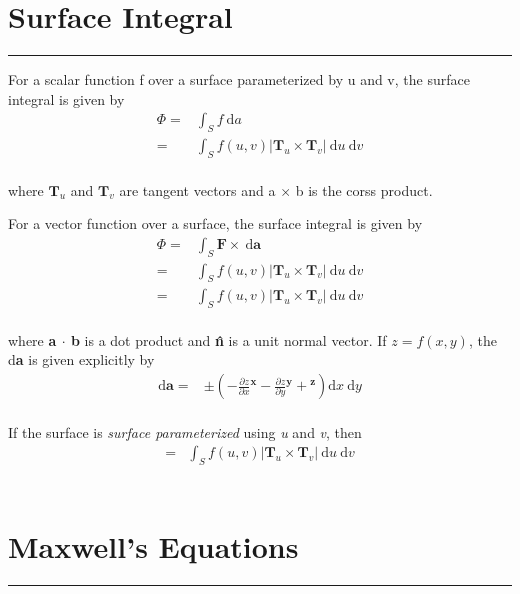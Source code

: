 \documentclass[letterpaper,10pt,fleqn]{article}
\numberwithin{equation}{section}
\newcommand{\D}{\mathrm{d}}
\begin{document}

\section*{Surface Integral}
\addtocounter{section}{1}
\hrule

For a scalar function f over a surface parameterized by u and v, the surface integral is given by
\\
\begin{eqnarray}
  \Phi =& \displaystyle\int_S f\ \D a \\
  =& \displaystyle\int_S f(u, v)|\mathbf{T}_u \times \mathbf{T}_v|\ \D u \ \D v
\end{eqnarray}
\\
where \(\mathbf{T}_u\) and \(\mathbf{T}_v\) are tangent vectors and a \(\times\) b is the corss product.

For a vector function over a surface, the surface integral is given by
\\
\begin{eqnarray}
  \Phi =& \displaystyle\int_S \mathbf{F} \times \ \D \mathbf{a} \\
  =& \displaystyle\int_S f(u, v)|\mathbf{T}_u \times \mathbf{T}_v|\ \D u \ \D v \\
  =& \displaystyle\int_S f(u, v)|\mathbf{T}_u \times \mathbf{T}_v|\ \D u \ \D v
\end{eqnarray}
\\
where \textbf{a \(\cdot\) b} is a dot product and \textbf{\^n} is a unit normal vector. If \(z = f(x, y)\), the d\textbf{a} is given explicitly by
\\
\begin{eqnarray}
  \D \mathbf{a} =& \pm \displaystyle(-\frac{\partial z}{\partial x}\mathbf{^x} - \frac{\partial z}{\partial y}\mathbf{^y} + \mathbf{^z}) \D x \ \D y
\end{eqnarray}
\\
If the surface is \emph{surface parameterized} using \emph{u} and \emph{v}, then
\\
\begin{eqnarray}
  =& \displaystyle\int_S f(u, v)|\mathbf{T}_u \times \mathbf{T}_v|\ \D u \ \D v
\end{eqnarray}
\\

\section*{Maxwell's Equations}
\addtocounter{section}{1}
\hrule
\end{document}
